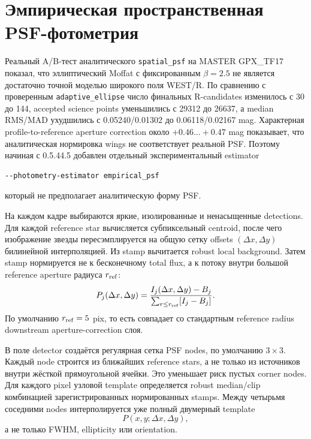 \section{Эмпирическая пространственная PSF-фотометрия}
\label{sec:empirical-psf-photometry}

Реальный A/B-тест аналитического \texttt{spatial\_psf} на MASTER GPX\_TF17 показал, что
эллиптический Moffat с фиксированным $\beta=2.5$ не является достаточно точной моделью широкого
поля WEST/R. По сравнению с проверенным \texttt{adaptive\_ellipse} число финальных R-candidates
изменилось с 30 до 144, accepted science points уменьшились с 29312 до 26637, а median
RMS/MAD ухудшились с 0.05240/0.01302 до 0.06118/0.02167 mag. Характерная
profile-to-reference aperture correction около $+0.46\ldots+0.47$ mag показывает, что аналитическая
нормировка wings не соответствует реальной PSF. Поэтому начиная с 0.5.44.5 добавлен отдельный
экспериментальный estimator
\begin{lstlisting}
--photometry-estimator empirical_psf
\end{lstlisting}
который не предполагает аналитическую форму PSF.

На каждом кадре выбираются яркие, изолированные и ненасыщенные detections. Для каждой reference
star вычисляется субпиксельный centroid, после чего изображение звезды пересэмплируется на общую
сетку offsets $(\Delta x,\Delta y)$ билинейной интерполяцией. Из stamp вычитается robust local
background. Затем stamp нормируется не к бесконечному total flux, а к потоку внутри большой
reference aperture радиуса $r_{\rm ref}$:
\begin{equation}
 P_j(\Delta x,\Delta y)=\frac{I_j(\Delta x,\Delta y)-B_j}
 {\sum_{r\le r_{\rm ref}}[I_j-B_j]}.
\end{equation}
По умолчанию $r_{\rm ref}=5$ pix, то есть совпадает со стандартным reference radius downstream
aperture-correction слоя.

В поле detector создаётся регулярная сетка PSF nodes, по умолчанию $3\times3$. Каждый node строится
из ближайших reference stars, а не только из источников внутри жёсткой прямоугольной ячейки. Это
уменьшает риск пустых corner nodes. Для каждого pixel узловой template определяется robust
median/clip комбинацией зарегистрированных нормированных stamps. Между четырьмя соседними nodes
интерполируется уже полный двумерный template
\begin{equation}
 P(x,y;\Delta x,\Delta y),
\end{equation}
а не только FWHM, ellipticity или orientation.

